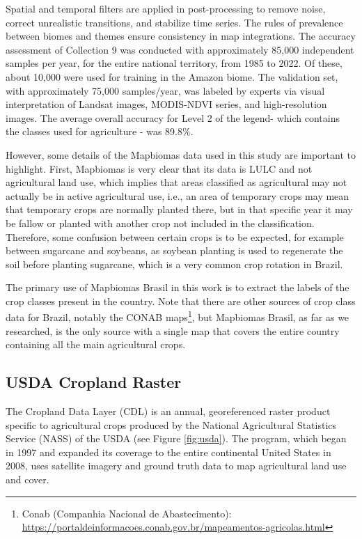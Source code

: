Spatial and temporal filters are applied in post-processing to remove noise, correct unrealistic transitions, and stabilize time series. The rules of prevalence between biomes and themes ensure consistency in map integrations. The accuracy assessment of Collection 9 was conducted with approximately 85,000 independent samples per year, for the entire national territory, from 1985 to 2022. Of these, about 10,000 were used for training in the Amazon biome. The validation set, with approximately 75,000 samples/year, was labeled by experts via visual interpretation of Landsat images, MODIS-NDVI series, and high-resolution images. The average overall accuracy for Level 2 of the legend- which contains the classes used for agriculture - was 89.8\%.

However, some details of the Mapbiomas data used in this study are important to highlight. First, Mapbiomas is very clear that its data is LULC and not agricultural land use, which implies that areas classified as agricultural may not actually be in active agricultural use, i.e., an area of temporary crops may mean that temporary crops are normally planted there, but in that specific year it may be fallow or planted with another crop not included in the classification. Therefore, some confusion between certain crops is to be expected, for example between sugarcane and soybeans, as soybean planting is used to regenerate the soil before planting sugarcane, which is a very common crop rotation in Brazil.

The primary use of Mapbiomas Brasil in this work is to extract the labels of the crop classes present in the country. Note that there are other sources of crop class data for Brazil, notably the CONAB maps\footnote{Conab (Companhia Nacional de Abastecimento): \url{https://portaldeinformacoes.conab.gov.br/mapeamentos-agricolas.html}}, but Mapbiomas Brasil, as far as we researched, is the only source with a single map that covers the entire country containing all the main agricultural crops.

\subsection{USDA Cropland Raster}
\label{sec:usda}

The Cropland Data Layer (CDL) is an annual, georeferenced raster product specific to agricultural crops produced by the National Agricultural Statistics Service (NASS) of the \ac{USDA} (see Figure \ref{fig:usda}). The program, which began in 1997 and expanded its coverage to the entire continental United States in 2008, uses satellite imagery and ground truth data to map agricultural land use and cover.

